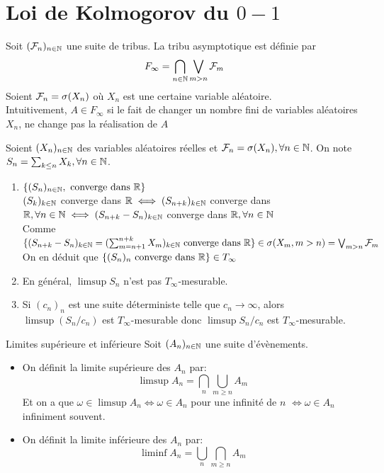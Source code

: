 \documentclass[]{report}
\begin{document}
    \section{Loi de Kolmogorov du $0-1$}

    Soit $(\mathcal{F}_n)_{n\in\mathbb{N}}$ une suite de tribus. La tribu asymptotique est définie par 
    \[F_\infty=\bigcap_{{n\in\mathbb{N}}}\bigvee_{m>n}\mathcal{F}_m\]
    Soient $\mathcal{F}_n=\sigma(X_n)$ où $X_n$ est une certaine variable aléatoire.\\
    Intuitivement, $A\in F_\infty$ si le fait de changer un nombre fini de variables aléatoires $X_n$, ne change pas la réalisation de $A$

    \begin{ex}{}{}
        Soient $(X_n)_{n\in\mathbb{N}}$ des variables aléatoires réelles et $\mathcal{F}_n=\sigma(X_n),\forall {n\in\mathbb{N}}$. On note $S_n=\sum_{k\le n} X_k,\forall{n\in\mathbb{N}}$.
        \begin{enumerate}
            \item $\{(S_n)_{n\in\mathbb{N}},\text{ converge dans $\mathbb{R}$}\}$\\
            $(S_k)_{k\in \mathbb{N}}$ converge dans $\mathbb{R} \iff (S_{n+k})_{k\in \mathbb{N}}$ converge dans $\mathbb{R},\forall n\in \mathbb{N} \iff (S_{n+k}-S_n)_{k\in \mathbb{N}}$ converge dans $\mathbb{R},\forall n\in \mathbb{N}$\\
            Comme $\{(S_{n+k}-S_n)_{k\in \mathbb{N}}=(\sum_{m=n+1}^{n+k}X_m)_{k\in \mathbb{N}}\text{ converge dans $\mathbb{R}$}\}\in \sigma(X_m,m>n)=\bigvee_{m>n}\mathcal{F}_m$\\
            On en déduit que $\{(S_n)_n\text{ converge dans $\mathbb{R}$}\}\in T_{\infty}$
            \item En général, $\limsup S_n$ n'est pas $T_\infty$-mesurable.
            \item Si $(c_n)_n$ est une suite déterministe telle que $c_n\to \infty$, alors $\limsup (S_n/c_n)$ est $T_\infty$-mesurable donc $\limsup S_n/c_n$ est $T_\infty$-mesurable.
        \end{enumerate}
    \end{ex}

    \begin{df}{Limites supérieure et inférieure}{}
        Soit $(A_n)_{n\in\mathbb{N}}$ une suite d'évènements. 
        \begin{itemize}
            \item On définit la limite supérieure des $A_n$ par:
            \[\limsup A_n=\bigcap_n\bigcup_{m\ge n} A_m\]
            Et on a que $\omega\in \limsup A_n\iff \omega\in A_n$ pour une infinité de $n$ $\iff \omega\in A_n$ infiniment souvent.
            \item On définit la limite inférieure des $A_n$ par:
            \[\liminf A_n=\bigcup_n\bigcap_{m\ge n}A_m\]
        \end{itemize}
    \end{df}
    
\end{document}
